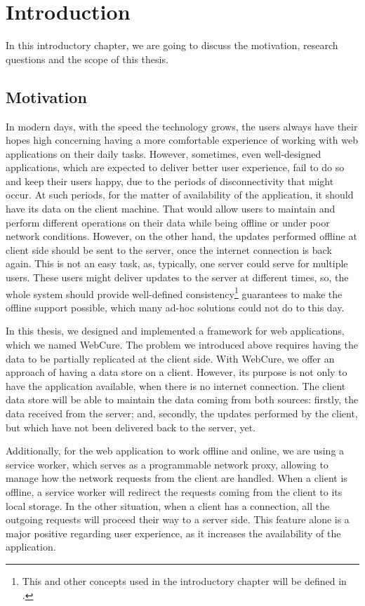 \chapter{Introduction}
\label{Introduction}

In this introductory chapter, we are going to discuss the motivation, research questions and the scope of this thesis.

\section{Motivation}
\label{Introduction-Motivation}

In modern days, with the speed the technology grows, the users always have their hopes high concerning having a more comfortable experience of working with web applications on their daily tasks. However, sometimes, even well-designed applications, which are expected to deliver better user experience, fail to do so and keep their users happy, due to the periods of disconnectivity that might occur. At such periods, for the matter of availability of the application, it should have its data on the client machine. That would allow users to maintain and perform different operations on their data while being offline or under poor network conditions. However, on the other hand, the updates performed offline at client side should be sent to the server, once the internet connection is back again. This is not an easy task, as, typically, one server could serve for multiple users. These users might deliver updates to the server at different times, so, the whole system should provide well-defined consistency\footnote{This and other concepts used in the introductory chapter will be defined in .} guarantees to make the offline support possible, which many ad-hoc solutions could not do to this day.

In this thesis, we designed and implemented a framework for web applications, which we named WebCure. The problem we introduced above requires having the data to be partially replicated at the client side. With WebCure, we offer an approach of having a data store on a client. However, its purpose is not only to have the application available, when there is no internet connection. The client data store will be able to maintain the data coming from both sources: firstly, the data received from the server; and, secondly, the updates performed by the client, but which have not been delivered back to the server, yet. 

Additionally, for the web application to work offline and online, we are using a service worker, which serves as a programmable network proxy\cite{32}, allowing to manage how the network requests from the client are handled. When a client is offline, a service worker will redirect the requests coming from the client to its local storage. In the other situation, when a client has a connection, all the outgoing requests will proceed their way to a server side. This feature alone is a major positive regarding user experience, as it increases the availability of the application. 

